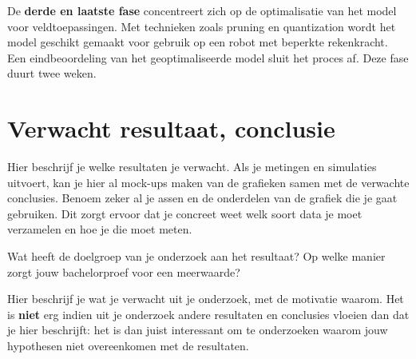 De \textbf{derde en laatste fase} concentreert zich op de optimalisatie van het model voor veldtoepassingen. Met technieken zoals pruning en quantization wordt het model geschikt gemaakt voor gebruik op een robot met beperkte rekenkracht. Een eindbeoordeling van het geoptimaliseerde model sluit het proces af. Deze fase duurt twee weken.

\section{Verwacht resultaat, conclusie}%
\label{sec:verwachte_resultaten}

Hier beschrijf je welke resultaten je verwacht. Als je metingen en simulaties uitvoert, kan je hier al mock-ups maken van de grafieken samen met de verwachte conclusies. Benoem zeker al je assen en de onderdelen van de grafiek die je gaat gebruiken. Dit zorgt ervoor dat je concreet weet welk soort data je moet verzamelen en hoe je die moet meten.

Wat heeft de doelgroep van je onderzoek aan het resultaat? Op welke manier zorgt jouw bachelorproef voor een meerwaarde?

Hier beschrijf je wat je verwacht uit je onderzoek, met de motivatie waarom. Het is \textbf{niet} erg indien uit je onderzoek andere resultaten en conclusies vloeien dan dat je hier beschrijft: het is dan juist interessant om te onderzoeken waarom jouw hypothesen niet overeenkomen met de resultaten.

